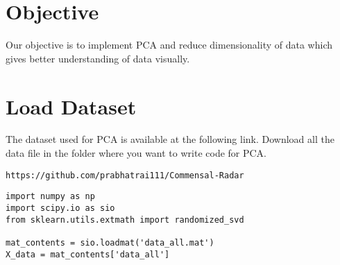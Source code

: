 \documentclass[journal,12pt,twocolumn]{IEEEtran}
\begin{document}
\section{Objective}
%
Our objective is to implement PCA and reduce dimensionality of data which gives better understanding of data visually.
%
\section{Load Dataset}
The dataset used for PCA is available at the following link. Download all the data file in the folder where you want to write code for PCA.
\begin{lstlisting}
https://github.com/prabhatrai111/Commensal-Radar
\end{lstlisting}
\begin{lstlisting}
import numpy as np
import scipy.io as sio
from sklearn.utils.extmath import randomized_svd

mat_contents = sio.loadmat('data_all.mat')
X_data = mat_contents['data_all']
\end{lstlisting}
\end{document}
